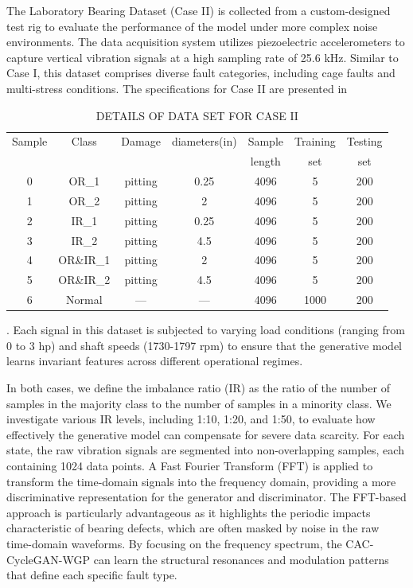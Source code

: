 \documentclass[twocolumn]{IEEEtran}
\begin{document}
The Laboratory Bearing Dataset (Case II) is collected from a custom-designed test rig to evaluate the performance of the model under more complex noise environments. The data acquisition system utilizes piezoelectric accelerometers to capture vertical vibration signals at a high sampling rate of 25.6 kHz. Similar to Case I, this dataset comprises diverse fault categories, including cage faults and multi-stress conditions. The specifications for Case II are presented in \begin{table}[htbp]
\centering
\caption{DETAILS OF DATA SET FOR CASE II}
\label{tab:dataset_caseII}
\begin{tabular}{ccccccc}
\hline
Sample & Class & Damage & diameters(in) & Sample & Training & Testing \\
 & & & & length & set & set \\
\hline
0 & OR\_1 & pitting & 0.25 & 4096 & 5 & 200 \\
1 & OR\_2 & pitting & 2 & 4096 & 5 & 200 \\
2 & IR\_1 & pitting & 0.25 & 4096 & 5 & 200 \\
3 & IR\_2 & pitting & 4.5 & 4096 & 5 & 200 \\
4 & OR\&IR\_1 & pitting & 2 & 4096 & 5 & 200 \\
5 & OR\&IR\_2 & pitting & 4.5 & 4096 & 5 & 200 \\
6 & Normal & --- & --- & 4096 & 1000 & 200 \\
\hline
\end{tabular}
\end{table}. Each signal in this dataset is subjected to varying load conditions (ranging from 0 to 3 hp) and shaft speeds (1730-1797 rpm) to ensure that the generative model learns invariant features across different operational regimes.

In both cases, we define the imbalance ratio (IR) as the ratio of the number of samples in the majority class to the number of samples in a minority class. We investigate various IR levels, including 1:10, 1:20, and 1:50, to evaluate how effectively the generative model can compensate for severe data scarcity. For each state, the raw vibration signals are segmented into non-overlapping samples, each containing 1024 data points. A Fast Fourier Transform (FFT) is applied to transform the time-domain signals into the frequency domain, providing a more discriminative representation for the generator and discriminator. The FFT-based approach is particularly advantageous as it highlights the periodic impacts characteristic of bearing defects, which are often masked by noise in the raw time-domain waveforms. By focusing on the frequency spectrum, the CAC-CycleGAN-WGP can learn the structural resonances and modulation patterns that define each specific fault type.
\end{document}
